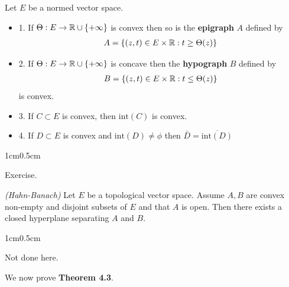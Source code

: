 \documentclass[12pt,a4paper]{article}
\newenvironment{proof}
{\begin{changemargin}{1cm}{0.5cm} 
	}%
	{\end{changemargin}
}
\renewenvironment{i}
{\begin{itemize} 
	}%
	{\end{itemize}
}
\newenvironment{p}
{\begin{proof} 
	}%
	{\end{proof}
}
\begin{document}
 Let $E$ be a normed vector space.
\begin{i}
\item[1.] If $\Theta : E\rightarrow \mathbb{R}\cup \{+ \infty\}$ is convex then so is the \textbf{epigraph} $A$ defined by
\begin{align*}
A = \{(z,t) \in E \times \mathbb{R} : t\geq \Theta (z) \}
\end{align*}
\item[2.] If $\Theta : E\rightarrow \mathbb{R}  \cup \{+ \infty \}$ is concave then the \textbf{hypograph} $B$ defined by
\begin{align*}
B = \{(z,t) \in E\times \mathbb{R} : t\leq \Theta(z) \}
\end{align*}
is convex.
\item[3.] If $C\subset E$ is convex, then $\text{int}(C)$ is convex.
\item[4.] If $D\subset E$ is convex and $\text{int}(D) \neq \phi$ then $\bar{D} = \overline{\text{int}(D)}$
\end{i}
\begin{p}
\pf Exercise.
\end{p}
\s

 \emph{(Hahn-Banach)} Let $E$ be a topological vector space. Assume $A, B$ are convex non-empty and disjoint subsets of $E$ and that $A$ is open. Then there exists a closed hyperplane separating $A$ and $B$.
\begin{p}
\pf Not done here.
\end{p}
\s

We now prove \textbf{Theorem 4.3}. 
\s
\end{document}
